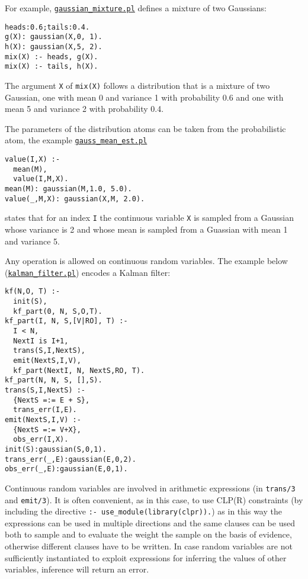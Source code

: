 For example, \href{http://cplint.lamping.unife.it/example/inference/gaussian_mixture.pl}{\texttt{gaussian\_mixture.pl}} defines a mixture of two Gaussians:
\begin{verbatim}
heads:0.6;tails:0.4.
g(X): gaussian(X,0, 1).
h(X): gaussian(X,5, 2).
mix(X) :- heads, g(X).
mix(X) :- tails, h(X).
\end{verbatim}
The argument \verb|X| of
\verb|mix(X)| follows a distribution that is a mixture of two Gaussian,
one with mean 0 and variance 1 with probability 0.6 and one with 
mean 5 and variance 2 with probability 0.4.

The parameters of the distribution atoms can be taken from the probabilistic
atom, the example \href{http://cplint.lamping.unife.it/example/inference/gauss_mean_est.pl}{\texttt{gauss\_mean\_est.pl}}
\begin{verbatim}
value(I,X) :-
  mean(M),
  value(I,M,X).
mean(M): gaussian(M,1.0, 5.0).
value(_,M,X): gaussian(X,M, 2.0).
\end{verbatim}
states that for an index \verb|I| the continuous variable \verb|X| is 
sampled from a Gaussian whose variance is 2 and whose mean is sampled from a Guassian with mean 1 and
variance 5.

Any operation is allowed on continuous random variables. The example below
(\href{http://cplint.lamping.unife.it/example/inference/kalman_filter.pl}{\texttt{kalman\_filter.pl}}) encodes a Kalman filter:
\begin{verbatim}
kf(N,O, T) :-
  init(S),
  kf_part(0, N, S,O,T).
kf_part(I, N, S,[V|RO], T) :-
  I < N,
  NextI is I+1,
  trans(S,I,NextS),
  emit(NextS,I,V),
  kf_part(NextI, N, NextS,RO, T).
kf_part(N, N, S, [],S).
trans(S,I,NextS) :-
  {NextS =:= E + S},
  trans_err(I,E).
emit(NextS,I,V) :-
  {NextS =:= V+X},
  obs_err(I,X).
init(S):gaussian(S,0,1).
trans_err(_,E):gaussian(E,0,2).
obs_err(_,E):gaussian(E,0,1).
\end{verbatim}
Continuous random variables are involved
in arithmetic expressions (in \verb|trans/3| and \verb|emit/3|). It
is often convenient, as in this case, to use CLP(R) constraints (by
including the directive \verb|:- use_module(library(clpr)).|) as 
in this way the expressions can be used in multiple directions and 
the same clauses can be used both to sample and to evaluate the weight the sample on the basis
of evidence,
otherwise different clauses have to be written.
In case random variables are not sufficiently instantiated to 
exploit expressions for inferring the values of other variables, 
inference will return an error.

